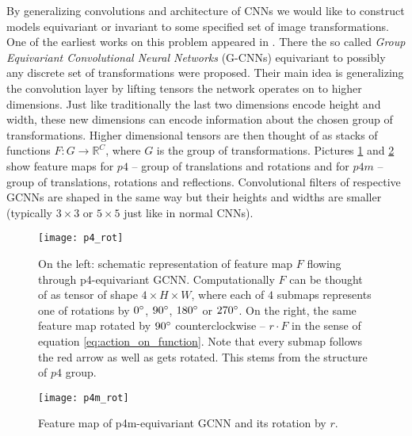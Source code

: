     By generalizing convolutions and architecture of CNNs we would like to
    construct models
    equivariant or invariant to some specified set of image transformations.
    One of the earliest works on this problem appeared in \cite{cohen2016}. There
    the so called \textit{Group Equivariant Convolutional Neural Networks}
    (G-CNNs) equivariant to possibly any discrete set of transformations were
    proposed. Their main idea is generalizing the convolution layer by
    lifting tensors the network operates on to higher dimensions.
    Just like traditionally the last two
    dimensions encode height and width, these new dimensions can
    encode information about the chosen group of transformations. Higher
    dimensional tensors are then thought of as stacks of functions
    $F:G\to\mathbb{R}^C$, where $G$ is the group of transformations.
    Pictures \ref{fig:p4_rot} and \ref{fig:p4m_rot} show
    feature maps for $p4$ -- group of translations and rotations and for
    $p4m$ -- group of
    translations, rotations and reflections.
    Convolutional filters of respective GCNNs are shaped in the same way
    but their heights and widths are smaller (typically $3\times3$ or $5\times5$
    just like in normal CNNs).
    \begin{figure}[h]
        \centering
        \texttt{[image: p4\_rot]}
        \caption{On the left: schematic representation of feature map $F$ flowing through
            p4-equivariant GCNN. Computationally $F$ can be thought of as tensor of shape
            $4\times H \times W$, where each of $4$ submaps represents one of
            rotations by $0\degree$, $90\degree$, $180\degree$ or $270\degree$.
            On the right, the same feature map rotated by
            $90 \degree$ counterclockwise -- $r\cdot F$ in the sense of equation
            \ref{eq:action_on_function}. Note that every submap follows the
            red arrow as well as gets rotated. This stems from the structure of
            $p4$ group.}
        \label{fig:p4_rot}
    \end{figure}
    \begin{figure}[h]
        \centering
        \texttt{[image: p4m\_rot]}
        \caption{Feature map of p4m-equivariant GCNN and its rotation by $r$.}
        \label{fig:p4m_rot}
    \end{figure}

